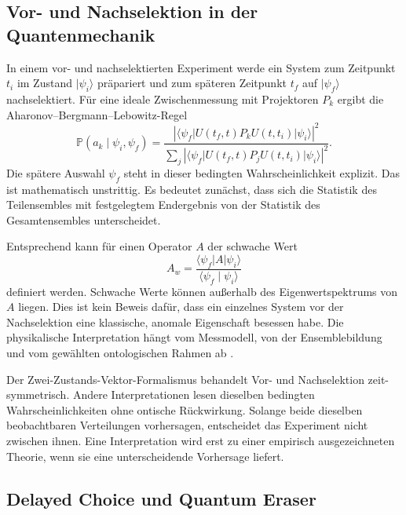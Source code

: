 \documentclass[11pt,a4paper]{article}
\theoremstyle{remark}
\begin{document}
\subsection{Vor- und Nachselektion in der Quantenmechanik}

In einem vor- und nachselektierten Experiment werde ein System zum Zeitpunkt
\(t_i\) im Zustand \(\lvert\psi_i\rangle\) präpariert und zum späteren
Zeitpunkt \(t_f\) auf \(\lvert\psi_f\rangle\) nachselektiert. Für eine ideale
Zwischenmessung mit Projektoren \(P_k\) ergibt die
Aharonov--Bergmann--Lebowitz-Regel
\citep{AharonovBergmannLebowitz1964}
\begin{equation}
\label{eq:abl}
 \mathbb P(a_k\mid\psi_i,\psi_f)
 =
 \frac{
 \left|\langle\psi_f\rvert U(t_f,t)P_kU(t,t_i)
 \lvert\psi_i\rangle\right|^2}
 {\displaystyle
 \sum_j
 \left|\langle\psi_f\rvert U(t_f,t)P_jU(t,t_i)
 \lvert\psi_i\rangle\right|^2}.
\end{equation}
Die spätere Auswahl \(\psi_f\) steht in dieser bedingten Wahrscheinlichkeit
explizit. Das ist mathematisch unstrittig. Es bedeutet zunächst, dass sich die
Statistik des Teilensembles mit festgelegtem Endergebnis von der Statistik des
Gesamtensembles unterscheidet.

Entsprechend kann für einen Operator \(A\) der schwache Wert
\begin{equation}
\label{eq:weak-value}
  A_w=
  \frac{\langle\psi_f\rvert A\lvert\psi_i\rangle}
       {\langle\psi_f\mid\psi_i\rangle}
\end{equation}
definiert werden. Schwache Werte können außerhalb des Eigenwertspektrums von
\(A\) liegen. Dies ist kein Beweis dafür, dass ein einzelnes System vor der
Nachselektion eine klassische, anomale Eigenschaft besessen habe. Die
physikalische Interpretation hängt vom Messmodell, von der Ensemblebildung
und vom gewählten ontologischen Rahmen ab
\citep{AharonovAlbertVaidman1988,Pusey2014}.

Der Zwei-Zustands-Vektor-Formalismus behandelt Vor- und Nachselektion
zeit-symmetrisch. Andere Interpretationen lesen dieselben bedingten
Wahrscheinlichkeiten ohne ontische Rückwirkung. Solange beide dieselben
beobachtbaren Verteilungen vorhersagen, entscheidet das Experiment nicht
zwischen ihnen. Eine Interpretation wird erst zu einer empirisch
ausgezeichneten Theorie, wenn sie eine unterscheidende Vorhersage liefert.

\subsection{Delayed Choice und Quantum Eraser}
\end{document}
